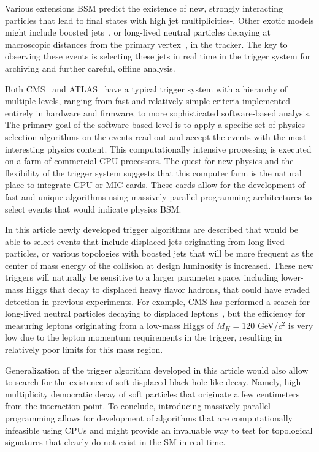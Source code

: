 \documentclass{JINST}
\begin{document}
Various extensions BSM predict the existence of new, strongly interacting particles that lead to final states
with high jet multiplicities\cite{bib:sixjets}-\cite{bib:altchiral}. Other exotic models might include boosted 
jets~\cite{Thaler:2008ju},\cite{Altheimer:2012mn} or long-lived neutral particles decaying at macroscopic distances 
from the primary vertex~\cite{bib:hiddenvalley},\cite{Halyo:2013yfa} 
in the tracker. The key to observing these events is selecting these jets in real time in the trigger system for archiving
 and further careful, offline analysis.

Both CMS~\cite{Chatrchyan:2008aa} and ATLAS~\cite{Aad:2008zzm} have a typical trigger system with a hierarchy of multiple levels, 
ranging from fast and relatively simple criteria implemented entirely in hardware and firmware, to more sophisticated software-based analysis. 
The primary goal of the software based level is to apply a specific set of 
physics selection algorithms on the events read out and accept the events with the most interesting physics 
content. This computationally intensive processing is executed on a farm of commercial CPU processors.
The quest for new physics and the flexibility of the trigger system suggests that this computer farm is the natural
place to integrate GPU or MIC cards. These cards allow for the development of fast and unique algorithms using massively
 parallel programming architectures to select events that would indicate physics BSM. 

In this article newly developed trigger algorithms are described that would be able to select events
that include displaced jets originating from long lived particles, or various topologies with boosted jets that will
be more frequent as the center of mass energy of the collision at design luminosity is increased. These new
triggers will naturally be sensitive to a larger parameter space, including lower-mass Higgs that decay to
displaced heavy flavor hadrons, that could have evaded detection in previous experiments. For example, CMS has 
performed a search for long-lived neutral particles decaying to displaced leptons~\cite{Chatrchyan:2012jna}, 
but the efficiency for measuring leptons originating from a low-mass Higgs of $M_H = 120$ GeV/$c^2$ is very low 
due to the lepton momentum requirements in the trigger, resulting in relatively poor limits for this mass region.

Generalization of the trigger algorithm developed in this article would also allow to search for 
 the existence of soft displaced black hole like decay. Namely, high multiplicity democratic decay of soft particles  
that originate a few centimeters from the interaction point. To conclude, introducing massively parallel programming
 allows for development of algorithms that are computationally infeasible using CPUs and
might provide an invaluable way to test for topological signatures that clearly do not exist in the SM in real time.
\end{document}
